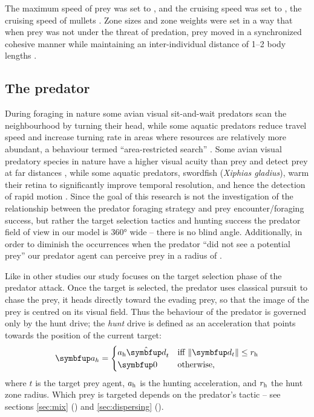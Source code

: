 The maximum speed of prey was set to , and the cruising speed was set to , the cruising speed of mullets \cite{videler1993fish}. Zone sizes and zone weights were set in a way that when prey was not under the threat of predation, prey moved in a synchronized cohesive manner while maintaining an inter-individual distance of 1--2 body lengths \cite{johansen2010kinematics,killen2011aerobic}.

\subsection{The predator}

During foraging in nature some avian visual sit-and-wait predators \cite{gall2010visual,orourke2010hawkeyes2} scan the neighbourhood by turning their head, while some aquatic predators reduce travel speed and increase turning rate in areas where resources are relatively more abundant, a behaviour termed ``area-restricted search'' \cite{thums2011insitu}. Some avian visual predatory species in nature have a higher visual acuity than prey and detect prey at far distances \cite{andersson2009predator}, while some aquatic predators, \eg swordfish (\emph{Xiphias gladius}), warm their retina to significantly improve temporal resolution, and hence the detection of rapid motion \cite{fritsches2005warm}. Since the goal of this research is not the investigation of the relationship between the predator foraging strategy and prey encounter/foraging success, but rather the target selection tactics and hunting success the predator field of view in our model is \ang{360} wide -- there is no blind angle. Additionally, in order to diminish the occurrences when the predator ``did not see a potential prey'' our predator agent can perceive prey in a radius of .

Like in other studies \cite{demsar2014simulated,kunz2006prey,nishimura2002predator,olson2013predator} our study focuses on the target selection phase of the predator attack. Once the target is selected, the predator uses classical pursuit \cite{nahin2012chases} to chase the prey, \ie it heads directly toward the evading prey, so that the image of the prey is centred on its visual field. Thus the behaviour of the predator is governed only by the hunt drive; the \emph{hunt} drive is defined as an acceleration that points towards the position of the current target:
%
\begin{equation}
\vec{a}_h=\begin{cases}
a_\textnormal{h} \uvec{d}_t & \textnormal{iff}\ \|\vec{d}_t\| \leq r_\textnormal{h} \\
\vec{0} & \textnormal{otherwise,}
\end{cases}
\end{equation}
%
where $t$ is the target prey agent, $a_\textnormal{h}$ is the hunting acceleration, and $r_\textnormal{h}$ the hunt zone radius. Which prey is targeted depends on the predator's tactic -- see sections \ref{sec:mix} () and \ref{sec:dispersing} ().

